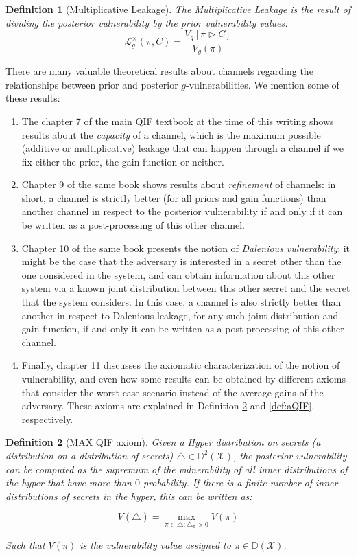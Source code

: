 \documentclass[conference]{IEEEtran}
\newtheorem{definition}{Definition}
\newcommand{\DX}{\mathbb{D}(\mathcal{X})}
\newcommand{\DDX}{\mathbb{D}^2(\mathcal{X})}
\begin{document}
\begin{definition}[Multiplicative Leakage]
The \emph{Multiplicative Leakage} is the result of dividing the posterior vulnerability by the prior vulnerability values:
$$\mathcal{L}_g^\times(\pi,C) = \frac{V_g[\pi\triangleright C]}{V_g(\pi)}$$
\end{definition}

There are many valuable theoretical results about channels regarding the relationships between prior and posterior $g$-vulnerabilities. We mention some of these results:

\begin{enumerate}
\item The chapter 7 of the main QIF textbook at the time of this writing \cite[Chapter~7]{QIF} shows results about the \emph{capacity} of a channel, which is the maximum possible (additive or multiplicative) leakage that can happen through a channel if we fix either the prior, the gain function or neither.
\item Chapter 9 of the same book \cite[Chapter~9]{QIF} shows results about \emph{refinement} of channels: in short, a channel is strictly better (for all priors and gain functions) than another channel in respect to the posterior vulnerability if and only if it can be written as a post-processing of this other channel.
\item Chapter 10 of the same book \cite[Chapter~10]{QIF} presents the notion of \emph{Dalenious vulnerability}: it might be the case that the adversary is interested in a secret other than the one considered in the system, and can obtain information about this other system via a known joint distribution between this other secret and the secret that the system considers. In this case, a channel is also strictly better than another in respect to Dalenious leakage, for any such joint distribution and gain function, if and only it can be written as a post-processing of this other channel.
\item Finally, chapter 11 \cite[Chapter~11]{QIF} discusses the axiomatic characterization of the notion of vulnerability, and even how some results can be obtained by different axioms that consider the worst-case scenario instead of the average gains of the adversary. These axioms are explained in Definition \ref{def:mQIF} and \ref{def:aQIF}, respectively.
\end{enumerate}

\begin{definition}[MAX QIF axiom]\label{def:mQIF}Given a Hyper distribution on secrets (a distribution on a distribution of secrets) $\triangle \in \DDX$, the posterior vulnerability can be computed as the supremum of the vulnerability of all inner distributions of the hyper that have more than $0$ probability. If there is a finite number of inner distributions of secrets in the hyper, this can be written as:

$$V(\triangle) = \max\limits_{\pi \in \triangle:\triangle_\pi > 0}V(\pi)$$

Such that $V(\pi)$ is the vulnerability value assigned to $\pi \in \DX$.
\end{definition}
\end{document}
